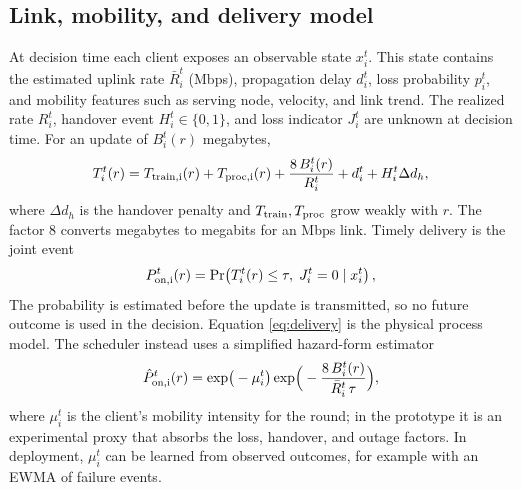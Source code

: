 \documentclass[conference]{IEEEtran}
\begin{document}
\subsection{Link, mobility, and delivery model}
At decision time each client exposes an observable state $x_i^t$. This state contains the estimated uplink rate $\bar R_i^t$ (Mbps), propagation delay $d_i^t$, loss probability $p_i^t$, and mobility features such as serving node, velocity, and link trend. The realized rate $R_i^t$, handover event $H_i^t\in\{0,1\}$, and loss indicator $J_i^t$ are unknown at decision time. For an update of $B_i^t(r)$ megabytes,
\begin{equation}
T_i^t(r)=T_{\rm train,i}(r)+T_{\rm proc,i}(r)+\frac{8\,B_i^t(r)}{R_i^t}+d_i^t+H_i^t\Delta d_h,
\label{eq:delivery}
\end{equation}
where $\Delta d_h$ is the handover penalty and $T_{\rm train},T_{\rm proc}$ grow weakly with $r$. The factor 8 converts megabytes to megabits for an Mbps link. Timely delivery is the joint event
\begin{equation}
P_{\rm on,i}^t(r)=\Pr\!\left(T_i^t(r)\le\tau,\;J_i^t=0\mid x_i^t\right),
\label{eq:pon}
\end{equation}
The probability is estimated before the update is transmitted, so no future outcome is used in the decision. Equation \eqref{eq:delivery} is the physical process model. The scheduler instead uses a simplified hazard-form estimator
\begin{equation}
\hat P_{\rm on,i}^t(r)=\exp\!\big(-\mu_i^t\big)\exp\!\Big(-\frac{8\,B_i^t(r)}{\bar R_i^t\,\tau}\Big),
\label{eq:hazard}
\end{equation}
where $\mu_i^t$ is the client's mobility intensity for the round; in the prototype it is an experimental proxy that absorbs the loss, handover, and outage factors. In deployment, $\mu_i^t$ can be learned from observed outcomes, for example with an EWMA of failure events.
\end{document}
